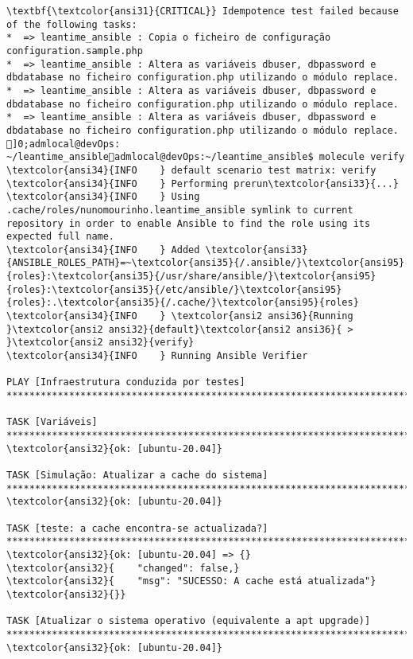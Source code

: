 \documentclass{scrartcl}
\begin{document}
\begin{Verbatim}
\textbf{\textcolor{ansi31}{CRITICAL}} Idempotence test failed because of the following tasks:
*  => leantime_ansible : Copia o ficheiro de configuração configuration.sample.php
*  => leantime_ansible : Altera as variáveis dbuser, dbpassword e dbdatabase no ficheiro configuration.php utilizando o módulo replace.
*  => leantime_ansible : Altera as variáveis dbuser, dbpassword e dbdatabase no ficheiro configuration.php utilizando o módulo replace.
*  => leantime_ansible : Altera as variáveis dbuser, dbpassword e dbdatabase no ficheiro configuration.php utilizando o módulo replace.
]0;admlocal@devOps: ~/leantime_ansibleadmlocal@devOps:~/leantime_ansible$ molecule verify
\textcolor{ansi34}{INFO    } default scenario test matrix: verify
\textcolor{ansi34}{INFO    } Performing prerun\textcolor{ansi33}{...}
\textcolor{ansi34}{INFO    } Using .cache/roles/nunomourinho.leantime_ansible symlink to current repository in order to enable Ansible to find the role using its expected full name.
\textcolor{ansi34}{INFO    } Added \textcolor{ansi33}{ANSIBLE_ROLES_PATH}=~\textcolor{ansi35}{/.ansible/}\textcolor{ansi95}{roles}:\textcolor{ansi35}{/usr/share/ansible/}\textcolor{ansi95}{roles}:\textcolor{ansi35}{/etc/ansible/}\textcolor{ansi95}{roles}:.\textcolor{ansi35}{/.cache/}\textcolor{ansi95}{roles}
\textcolor{ansi34}{INFO    } \textcolor{ansi2 ansi36}{Running }\textcolor{ansi2 ansi32}{default}\textcolor{ansi2 ansi36}{ > }\textcolor{ansi2 ansi32}{verify}
\textcolor{ansi34}{INFO    } Running Ansible Verifier

PLAY [Infraestrutura conduzida por testes] ***********************************************************************************************

TASK [Variáveis] *************************************************************************************************************************
\textcolor{ansi32}{ok: [ubuntu-20.04]}

TASK [Simulação: Atualizar a cache do sistema] *******************************************************************************************
\textcolor{ansi32}{ok: [ubuntu-20.04]}

TASK [teste: a cache encontra-se actualizada?] *******************************************************************************************
\textcolor{ansi32}{ok: [ubuntu-20.04] => {}
\textcolor{ansi32}{    "changed": false,}
\textcolor{ansi32}{    "msg": "SUCESSO: A cache está atualizada"}
\textcolor{ansi32}{}}

TASK [Atualizar o sistema operativo (equivalente a apt upgrade)] *************************************************************************
\textcolor{ansi32}{ok: [ubuntu-20.04]}


\end{Verbatim}
\end{document}
